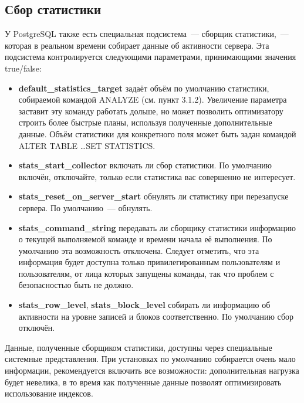 \subsection{Сбор статистики}
У PostgreSQL также есть специальная подсистема~--- сборщик статистики,~--- которая в реальном времени собирает данные об 
активности сервера. Эта подсистема контролируется следующими параметрами, принимающими значения true/false:
\begin{itemize}
\item \textbf{default\_statistics\_target} задаёт объём по умолчанию статистики, собираемой командой ANALYZE (см. пункт 3.1.2). 
Увеличение параметра заставит эту команду работать дольше, но может позволить оптимизатору строить более быстрые планы, 
используя полученные дополнительные данные. Объём статистики для конкретного поля может быть задан командой 
ALTER TABLE \dots SET STATISTICS.
\item \textbf{stats\_start\_collector} включать ли сбор статистики. По умолчанию включён, отключайте, только если статистика вас 
совершенно не интересует.
\item \textbf{stats\_reset\_on\_server\_start} обнулять ли статистику при перезапуске сервера. По умолчанию~--- обнулять.
\item \textbf{stats\_command\_string} передавать ли сборщику статистики информацию о текущей выполняемой команде и времени 
начала её выполнения. По умолчанию эта возможность отключена. Следует отметить, что эта информация будет доступна только 
привилегированным пользователям и пользователям, от лица которых запущены команды, так что проблем с безопасностью быть не должно.
\item \textbf{stats\_row\_level}, \textbf{stats\_block\_level} собирать ли информацию об активности на уровне записей и 
блоков соответственно. По умолчанию сбор отключён.
\end{itemize}

Данные, полученные сборщиком статистики, доступны через специальные системные представления. При установках по умолчанию собирается 
очень мало информации, рекомендуется включить все возможности: дополнительная нагрузка будет невелика, в то время как полученные 
данные позволят оптимизировать использование индексов.